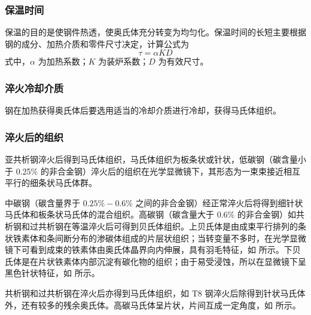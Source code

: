         \subsubsection{保温时间}
            保温的目的是使钢件热透，使奥氏体充分转变为均匀化。保温时间的长短主要根据钢的成分、加热介质和零件尺寸决定，计算公式为
            \begin{equation}
                \tau=\alpha KD
            \end{equation}
            式中，$\alpha$ 为加热系数；$K$ 为装炉系数；$D$ 为有效尺寸。
        \subsubsection{淬火冷却介质}
            钢在加热获得奥氏体后要选用适当的冷却介质进行冷却，获得马氏体组织。
        \subsubsection{淬火后的组织}
            亚共析钢淬火后得到马氏体组织，马氏体组织为板条状或针状，低碳钢（碳含量小于 0.25\% 的非合金钢）淬火后的组织在光学显微镜下，其形态为一束束接近相互平行的细条状马氏体群。\par
            中碳钢（碳含量界于 $0.25\%-0.6\%$ 之间的非合金钢）经正常淬火后将得到细针状马氏体和板条状马氏体的混合组织。高碳钢（碳含量大于 $0.6\%$ 的非合金钢）如共析钢和过共析钢在等温淬火后可得到贝氏体组织。上贝氏体是由成束平行排列的条状铁素体和条间断分布的渗碳体组成的片层状组织；当转变量不多时，在光学显微镜下可看到成束的铁素体由奥氏体晶界向内伸展，具有羽毛特征，如 所示。下贝氏体是在片状铁素体内部沉淀有碳化物的组织；由于易受浸蚀，所以在显微镜下呈黑色针状特征，如 所示。\par
            共析钢和过共析钢在淬火后亦得到马氏体组织，如 T8 钢淬火后除得到针状马氏体外，还有较多的残余奥氏体。高碳马氏体呈片状，片间互成一定角度，如 所示。
